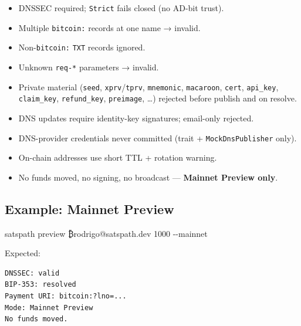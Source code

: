 \documentclass[
]{article}
\newenvironment{Shaded}{}{}
\newcommand{\AttributeTok}[1]{\textcolor[rgb]{0.49,0.56,0.16}{#1}}
\newcommand{\ExtensionTok}[1]{#1}
\newcommand{\NormalTok}[1]{#1}
\providecommand{\tightlist}{%
  \setlength{\itemsep}{0pt}\setlength{\parskip}{0pt}}
\begin{document}
\begin{itemize}
\tightlist
\item[$\boxtimes$]
  DNSSEC required; \texttt{Strict} fails closed (no AD-bit trust).
\item[$\boxtimes$]
  Multiple \texttt{bitcoin:} records at one name → invalid.
\item[$\boxtimes$]
  Non-\texttt{bitcoin:} \texttt{TXT} records ignored.
\item[$\boxtimes$]
  Unknown \texttt{req-*} parameters → invalid.
\item[$\boxtimes$]
  Private material (\texttt{seed}, \texttt{xprv}/\texttt{tprv},
  \texttt{mnemonic}, \texttt{macaroon}, \texttt{cert},
  \texttt{api\_key}, \texttt{claim\_key}, \texttt{refund\_key},
  \texttt{preimage}, \ldots) rejected before publish and on resolve.
\item[$\boxtimes$]
  DNS updates require identity-key signatures; email-only rejected.
\item[$\boxtimes$]
  DNS-provider credentials never committed (trait +
  \texttt{MockDnsPublisher} only).
\item[$\boxtimes$]
  On-chain addresses use short TTL + rotation warning.
\item[$\boxtimes$]
  No funds moved, no signing, no broadcast --- \textbf{Mainnet Preview
  only}.
\end{itemize}

\hypertarget{example-mainnet-preview}{%
\subsection{Example: Mainnet Preview}\label{example-mainnet-preview}}

\begin{Shaded}
\begin{Highlighting}[]
\ExtensionTok{satspath}\NormalTok{ preview ₿rodrigo@satspath.dev 1000 }\AttributeTok{{-}{-}mainnet}
\end{Highlighting}
\end{Shaded}

Expected:

\begin{verbatim}
DNSSEC: valid
BIP-353: resolved
Payment URI: bitcoin:?lno=...
Mode: Mainnet Preview
No funds moved.
\end{verbatim}
\end{document}
